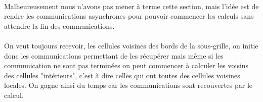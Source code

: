 \documentclass[12pt]{article}
\begin{document}
\paragraph{}Malheureusement nous n'avons pas mener à terme cette section, mais l'idée est de rendre les communications asynchrones pour pouvoir commencer les calculs sans attendre la fin des communications.

\paragraph{}On veut toujours recevoir, les cellules voisines des bords de la sous-grille, on initie donc les communications permettant de les récupérer mais même si les communication ne sont pas terminées on peut commencer à calculer les voisins des cellules "intérieurs", c'est à dire celles qui ont toutes des cellules voisines locales. On gagne ainsi du temps car les communications sont recouvertes par le calcul.
\end{document}
